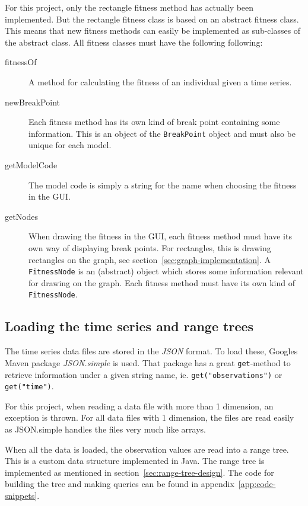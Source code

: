 For this project, only the rectangle fitness method has actually been
implemented. But the rectangle fitness class is based on an abstract fitness
class. This means that new fitness methods can easily be implemented as
sub-classes of the abstract class. All fitness classes must have the following
following: 
\begin{description}
    \item[fitnessOf] A method for calculating the fitness of an individual given
    a time series. 
    \item[newBreakPoint] Each fitness method has its own kind of break point
    containing some information. This is an object of the \texttt{BreakPoint}
    object and must also be unique for each model. 
    \item[getModelCode] The model code is simply a string for the name when
    choosing the fitness in the GUI. 
    \item[getNodes] When drawing the fitness in the GUI, each fitness method
    must have its own way of displaying break points. For rectangles, this is
    drawing rectangles on the graph, see section~\ref{sec:graph-implementation}.
    A \texttt{FitnessNode} is an (abstract) object which stores some information
    relevant for drawing on the graph. Each fitness method must have its own
    kind of \texttt{FitnessNode}. 
\end{description}


\subsection{Loading the time series and range trees}

The time series data files are stored in the \textit{JSON} format. To load
these, Googles Maven package \textit{JSON.simple} is used. That package has a
great \texttt{get}-method to retrieve information under a given string name, ie.
\texttt{get("observations")} or \texttt{get("time")}. 

For this project, when reading a data file with more than 1 dimension, an
exception is thrown. For all data files with 1 dimension, the files are read
easily as JSON.simple handles the files very much like arrays. 

When all the data is loaded, the observation values are read into a range tree.
This is a custom data structure implemented in Java. The range tree is
implemented as mentioned in section~\ref{sec:range-tree-design}. The code for
building the tree and making queries can be found in
appendix~\ref{app:code-snippets}. 

